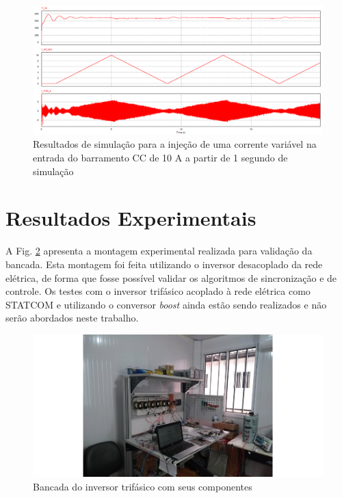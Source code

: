 \begin{figure}[!hbt]
	\begin{center}
    \includegraphics[width=\textwidth]{figuras/sim_figures/inversor_e_boost_variavel/dados.PNG}
    \caption{Resultados de simulação para a injeção de uma corrente variável na entrada do barramento CC de 10 A a partir de 1 segundo de simulação}
    \label{fig:sim-controle-corrente}
    \end{center}
\end{figure}

\section{Resultados Experimentais}

A Fig. \ref{fig:res-bancada-inversor} apresenta a montagem experimental realizada para validação da bancada.
Esta montagem foi feita utilizando o inversor desacoplado da rede elétrica, de forma que fosse possível validar
os algoritmos de sincronização e de controle. Os testes com o inversor trifásico acoplado à rede elétrica como STATCOM e
utilizando o conversor \textit{boost} ainda estão sendo realizados e não serão abordados neste trabalho.

\begin{figure}[!hbt]
	\begin{center}
    \includegraphics[width=\textwidth]{figuras/resultados-montagem-laboratorial.png}
    \caption{Bancada do inversor trifásico com seus componentes}
    \label{fig:res-bancada-inversor}
    \end{center}
\end{figure}

